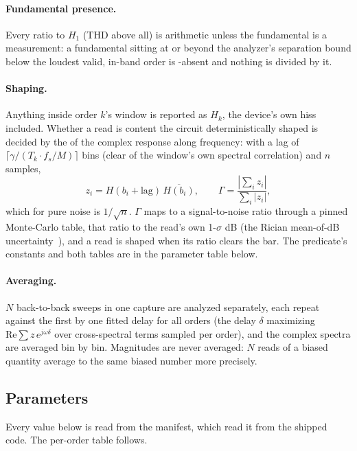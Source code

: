 \documentclass[11pt,a4paper]{article}
\begin{document}
\paragraph{Fundamental presence.} Every ratio to $H_1$ (THD above all) is
arithmetic unless the fundamental is a measurement: a fundamental sitting at
or beyond the analyzer's separation bound below the loudest valid, in-band
order is -absent and nothing is divided by it.

\paragraph{Shaping.}\label{sec:hd-shaping}
Anything inside order $k$'s window is reported as $H_k$, the device's own
hiss included. Whether a read is content the circuit deterministically shaped
is decided by the  of the complex response along frequency:
with a lag of $\lceil \gamma/(T_k \cdot f_s/M) \rceil$ bins (clear of the
window's own spectral correlation) and $n$ samples,
\begin{equation}
  z_i = H(b_i + \mathrm{lag})\,\overline{H(b_i)},\qquad
  \Gamma = \frac{|\sum_i z_i|}{\sum_i |z_i|},
  \label{eq:coherence}
\end{equation}
which for pure noise is $1/\sqrt n$. $\Gamma$ maps to a signal-to-noise
ratio through a pinned Monte-Carlo table, that ratio to the read's own
1-$\sigma$ dB  (the Rician mean-of-dB
uncertainty~\citep{rice1944}), and a read is shaped when its ratio clears
the bar. The predicate's constants and both tables are in the parameter
table below.

\paragraph{Averaging.} $N$ back-to-back sweeps in one capture are analyzed
separately, each repeat  against the first by
one fitted delay for all orders (the delay $\delta$ maximizing
$\mathrm{Re}\sum z\,e^{j\omega\delta}$ over cross-spectral terms sampled per
order), and the complex spectra are averaged bin by bin. Magnitudes are
never averaged: $N$ reads of a biased quantity average to the same biased
number more precisely.

\subsection{Parameters}
\label{sec:hd-parameters}
Every value below is read from the manifest, which read it from the
shipped code. The per-order table follows.
\end{document}
